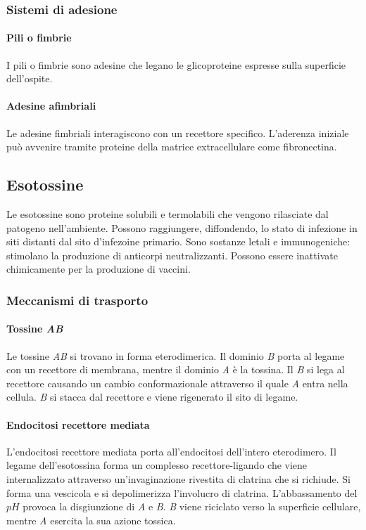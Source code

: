 		\subsubsection{Sistemi di adesione}

			\paragraph{Pili o fimbrie}
			I pili o fimbrie sono adesine che legano le glicoproteine espresse sulla superficie dell'ospite.

			\paragraph{Adesine afimbriali}
			Le adesine fimbriali interagiscono con un recettore specifico.
			L'aderenza iniziale pu\`o avvenire tramite proteine della matrice extracellulare come fibronectina.


	\subsection{Esotossine}
	Le esotossine sono proteine solubili e termolabili che vengono rilasciate dal patogeno nell'ambiente.
	Possono raggiungere, diffondendo, lo stato di infezione in siti distanti dal sito d'infezoine primario.
	Sono sostanze letali e immunogeniche: stimolano la produzione di anticorpi neutralizzanti.
	Possono essere inattivate chimicamente per la produzione di vaccini.

		\subsubsection{Meccanismi di trasporto}

			\paragraph{Tossine \emph{AB}}
			Le tossine \emph{AB} si trovano in forma eterodimerica.
			Il dominio \emph{B} porta al legame con un recettore di membrana, mentre il dominio \emph{A} \`e la tossina.
			Il \emph{B} si lega al recettore causando un cambio conformazionale attraverso il quale \emph{A} entra nella cellula.
			\emph{B} si stacca dal recettore e viene rigenerato il sito di legame.

			\paragraph{Endocitosi recettore mediata}
			L'endocitosi recettore mediata porta all'endocitosi dell'intero eterodimero.
			Il legame dell'esotossina forma un complesso recettore-ligando che viene internalizzato attraverso un'invaginazione rivestita di clatrina che si richiude.
			Si forma una vescicola e si depolimerizza l'involucro di clatrina.
			L'abbassamento del $pH$ provoca la disgiunzione di \emph{A} e \emph{B}.
			\emph{B} viene riciclato verso la superficie cellulare, mentre \emph{A} esercita la sua azione tossica.


